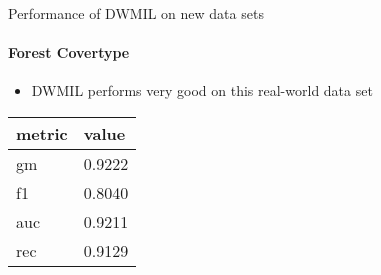 
\begin{frame}{Performance of DWMIL on new data sets}
\framesubtitle{Forest Covertype}

\begin{itemize}
    \item DWMIL performs very good on this real-world data set
\end{itemize}

\begin{table}[h]
    \centering
    \begin{tabular}{ | l | l | }
    \hline
    metric & value \\ \hline \hline
    gm & 0.9222 \\ \hline
    f1 & 0.8040 \\ \hline
    auc & 0.9211 \\ \hline
    rec & 0.9129 \\ \hline
    \end{tabular}
\end{table}

\end{frame}

